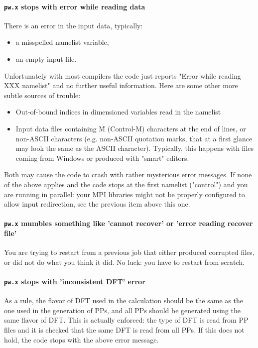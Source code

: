 \documentclass[12pt,a4paper]{article}
\def\pw.x{\texttt{pw.x}}
\begin{document}
\paragraph{\pw.x stops with error while reading data}
There is an error in the input data, typically:
\begin{itemize}
\item a misspelled namelist variable,
\item an empty input file.
\end{itemize}
Unfortunately with most compilers the code just reports "Error while
reading XXX namelist" and no further useful information.
Here are some other more subtle sources of trouble:
\begin{itemize}
\item Out-of-bound indices in dimensioned variables read in the namelist
\item Input data files containing \^M (Control-M) characters at the end
  of lines, or non-ASCII characters (e.g. non-ASCII quotation marks,
  that at a first glance may look the same as the ASCII
  character). Typically, this happens with files coming from Windows
  or produced with "smart" editors.  
\end{itemize}
Both may cause the code to crash with rather mysterious error messages.
If none of the above applies and the code stops at the first namelist
("control") and you are running in parallel: your MPI libraries might
not be properly configured to allow input redirection, see the
previous item above this one. 

\paragraph{\pw.x mumbles something like 'cannot recover' or 'error
  reading recover file'} 
You are trying to restart from a previous job that either
produced corrupted files, or did not do what you think it did. No luck: you
have to restart from scratch.

\paragraph{\pw.x stops with 'inconsistent DFT' error}
As a rule, the flavor of DFT used in the calculation should be the
same as the one used in the generation of PPs, and all PPs should be
generated using the same flavor of DFT. This is actually enforced: the
type of DFT is read from PP files and it is checked that the same DFT
is read from all PPs. If this does not hold, the code stops with the
above error message. 
\end{document}
